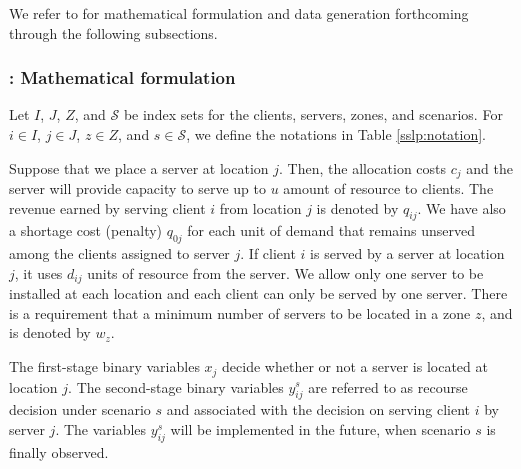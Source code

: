 We refer to \cite{journal:NS2005} for mathematical formulation and data generation forthcoming through the following subsections.


\subsubsection{\sslp: Mathematical formulation}
Let $I$, $J$, $Z$, and $\mathcal{S}$ be index sets for the clients, servers, zones, and scenarios. For $i\in I$, $j\in J$, $z\in Z$, and $s\in\mathcal{S}$, we define the notations in Table \ref{sslp:notation}.

Suppose that we place a server at location $j$. Then, the allocation costs $c_j$ and the server will provide capacity to serve up to $u$ amount of resource to clients. The revenue earned by serving client $i$ from location $j$ is denoted by $q_{ij}$. We have also a shortage cost (penalty) $q_{0j}$ for each unit of demand that remains unserved among the clients assigned to server $j$. If client $i$ is served by a server at location $j$, it uses $d_{ij}$ units of resource from the server. We allow only one server to be installed at each location and each client can only be served by one server. There is a requirement that a minimum number of servers to be located in a zone $z$, and is denoted by $w_z$. 

The first-stage binary variables $x_j$ decide whether or not a server is located at location $j$. The second-stage binary variables $y_{ij}^s$ are referred to as recourse decision under scenario $s$ and associated with the decision on serving client $i$ by server $j$. The variables $y_{ij}^s$ will be implemented in the future, when scenario $s$ is finally observed.

